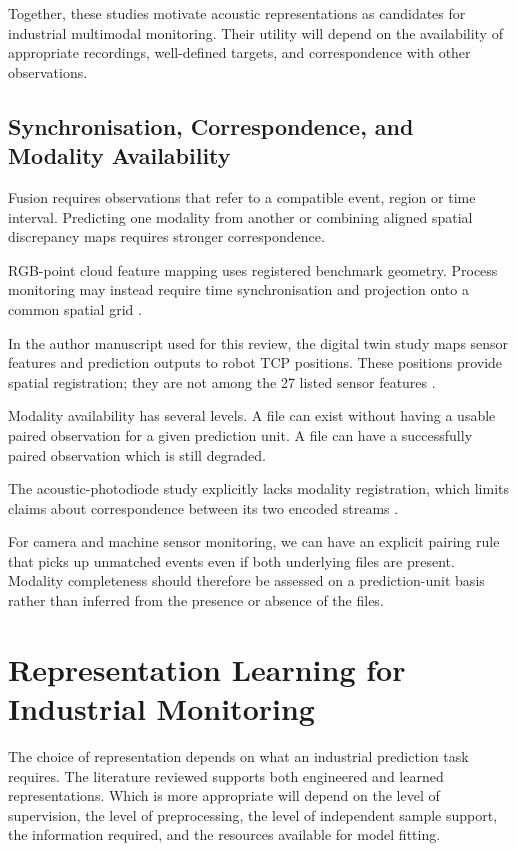 Together, these studies motivate acoustic representations as candidates for industrial multimodal
monitoring. Their utility will depend on the availability of appropriate recordings, well-defined
targets, and correspondence with other observations.

\subsection{Synchronisation, Correspondence, and Modality Availability}

Fusion requires observations that refer to a compatible event, region or time interval. Predicting
one modality from another or combining aligned spatial discrepancy maps requires stronger
correspondence.

RGB-point cloud feature mapping uses registered benchmark geometry. Process monitoring may instead
require time synchronisation and projection onto a common spatial grid
\parencite{Costanzino2024Multimodal,Petrich2021Multimodal}.

In the author manuscript used for this review, the digital twin study maps sensor features and prediction
outputs to robot TCP positions. These positions provide spatial registration; they are not among
the 27 listed sensor features \parencite{Chen2023Multisensor}.

Modality availability has several levels. A file can exist without having a usable paired
observation for a given prediction unit. A file can have a successfully paired observation which is
still degraded.

The acoustic-photodiode study explicitly lacks modality registration, which limits claims about
correspondence between its two encoded streams \parencite{Li2022A}.

For camera and machine sensor monitoring, we can have an explicit pairing rule that picks up
unmatched events even if both underlying files are present. Modality completeness should therefore
be assessed on a prediction-unit basis rather than inferred from the presence or absence of the
files.

\section{Representation Learning for Industrial Monitoring}

The choice of representation depends on what an industrial prediction task requires.
The literature reviewed supports both engineered and learned representations. Which is more
appropriate will depend on the level of supervision, the level of preprocessing, the level of
independent sample support, the information required, and the resources available for model fitting.


